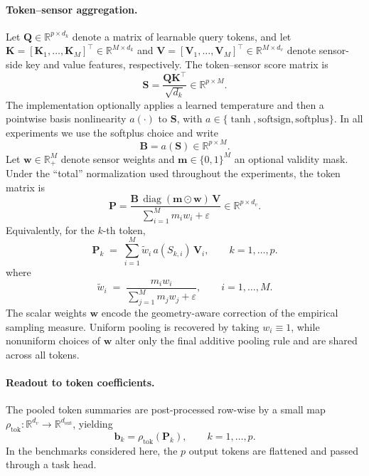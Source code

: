 \documentclass[11pt]{article}
\begin{document}
\paragraph{Token--sensor aggregation.}
Let $\mathbf{Q}\in\mathbb{R}^{p\times d_k}$ denote a matrix of learnable query
tokens, and let
$\mathbf{K}=[\boldsymbol{K}_1,\dots,\boldsymbol{K}_M]^\top\in\mathbb{R}^{M\times d_k}$
and
$\mathbf{V}=[\boldsymbol{V}_1,\dots,\boldsymbol{V}_M]^\top\in\mathbb{R}^{M\times d_v}$
denote sensor-side key and value features, respectively.  The token--sensor
score matrix is
\[
\mathbf{S} = \frac{\mathbf{Q}\mathbf{K}^\top}{\sqrt{d_k}}
\in \mathbb{R}^{p \times M}.
\]
The implementation optionally applies a learned temperature and then a
pointwise basis nonlinearity $a(\cdot)$ to $\mathbf{S}$, with
$a\in\{\tanh,\mathrm{softsign},\mathrm{softplus}\}$.  In all experiments we use
the softplus choice and write
\[
\mathbf{B} = a(\mathbf{S}) \in \mathbb{R}^{p\times M}.
\]
Let
$\boldsymbol{w}\in\mathbb{R}_{+}^{M}$ denote sensor weights and
$\boldsymbol{m}\in\{0,1\}^{M}$ an optional validity mask.  Under the
``total'' normalization used throughout the experiments, the token matrix is
\begin{equation}
  \mathbf{P}
  =
  \frac{\mathbf{B}\,\operatorname{diag}(\boldsymbol{m}\odot\boldsymbol{w})\,\mathbf{V}}
       {\sum_{i=1}^{M} m_i w_i + \varepsilon}
  \in\mathbb{R}^{p\times d_v}.
  \label{eq:setkey_pool}
\end{equation}
Equivalently, for the $k$-th token,
\[
\boldsymbol{P}_k
\;=\;
\sum_{i=1}^{M} \tilde w_i\,a(S_{k,i})\,\boldsymbol{V}_i,
\qquad k=1,\dots,p.
\]
where
\[
\tilde w_i
\;=\;
\frac{m_i w_i}{\sum_{j=1}^{M} m_j w_j + \varepsilon},
\qquad i=1,\dots,M.
\]
The scalar weights $\boldsymbol{w}$ encode the geometry-aware correction of the
empirical sampling measure.  Uniform pooling is recovered by taking
$w_i \equiv 1$, while nonuniform choices of $\boldsymbol{w}$ alter only the
final additive pooling rule and are shared across all tokens.

\paragraph{Readout to token coefficients.}
The pooled token summaries are post-processed row-wise by a small map
$\rho_{\mathrm{tok}}:\mathbb{R}^{d_v}\to\mathbb{R}^{d_{\mathrm{out}}}$,
yielding
\[
\boldsymbol{b}_k = \rho_{\mathrm{tok}}(\boldsymbol{P}_k),
\qquad k=1,\dots,p.
\]
In the benchmarks considered here, the $p$ output tokens are flattened and
passed through a task head.
\end{document}

